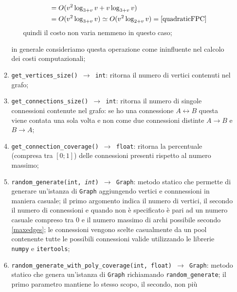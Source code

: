 \begin{enumerate}
\begin{enumerate}[resume]
\begin{itemize}
\begin{equation}
\begin{aligned}
                                                                   & = O(v^2\log_{3+v}v+ v\log_{3+v}v)                                   \\
                                                                   & = O(v^2\log_{3+v}v) \simeq O(v^2\log_{2+v}v) = \eqref{quadraticFPC}
                                          \end{aligned}
                                    \end{equation}
                                    quindi il costo non varia nemmeno in questo caso;
                        \end{itemize}
                        in generale consideriamo questa operazione come ininfluente nel calcolo dei costi computazionali;
                  \item \texttt{get\_vertices\_size() $\rightarrow$ int}: ritorna il numero di vertici contenuti nel grafo;
                  \item \texttt{get\_connections\_size() $\rightarrow$ int}: ritorna il numero di singole connessioni contenute nel grafo:
                        se ho una connessione $A \leftrightarrow B$ questa viene contata una sola volta e non come due connessioni distinte
                        $A \rightarrow B$ e $B \rightarrow A$;
                  \item \texttt{get\_connection\_coverage() $\rightarrow$ float}: ritorna la percentuale (compresa tra $[0;1]$) delle connessioni
                        presenti rispetto al numero massimo;
                  \item \texttt{random\_generate(int, \textit{int}) $\rightarrow$ Graph}: metodo statico che permette di generare un'istanza
                        di \texttt{Graph} aggiungendo vertici e connnessioni in maniera casuale; il primo argomento indica il numero di vertici, il secondo
                        il numero di connessioni e quando non è specificato è pari ad un numero casuale compreso tra 0 e il numero massimo di
                        archi possibile secondo \eqref{maxedges}; le connessioni vengono scelte casualmente da un pool contenente tutte le possibili
                        connessioni valide utilizzando le librerie \texttt{numpy} e \texttt{itertools};
                  \item \texttt{random\_generate\_with\_poly\_coverage(int, float) $\rightarrow$ Graph}: metodo statico che genera un'istanza
                        di \texttt{Graph} richiamando \texttt{random\_generate}; il primo parametro mantiene lo stesso scopo, il secondo, non più

\end{enumerate}
\end{enumerate}
